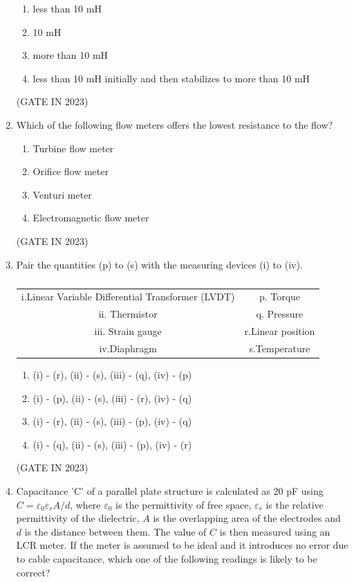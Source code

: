 \documentclass[journal]{IEEEtran}
\begin{document}
\begin{enumerate}
    \begin{enumerate}
        \item less than 10 mH
        \item 10 mH
        \item more than 10 mH
        \item less than 10 mH initially and then stabilizes to more than 10 mH
    \end{enumerate}
    \hfill(GATE IN 2023)

    \item Which of the following flow meters offers the lowest resistance to the flow?
    
    \begin{enumerate}
        \item Turbine flow meter
        \item Orifice flow meter
        \item Venturi meter
        \item Electromagnetic flow meter
    \end{enumerate}
    \hfill(GATE IN 2023)

    \item Pair the quantities (p) to (s) with the measuring devices (i) to (iv).
    
\begin{table}[H]
\begin{tabular}{c c}
i.Linear Variable Differential Transformer (LVDT)& p. Torque \\
ii. Thermistor & q. Pressure \\
iii. Strain gauge & r.Linear position  \\
iv.Diaphragm & s.Temperature \\
\end{tabular}
\caption{}
\label{tab:matching 1}
\end{table}
    \begin{enumerate}
        \item (i) - (r), (ii) - (s), (iii) - (q), (iv) - (p)
        \item (i) - (p), (ii) - (s), (iii) - (r), (iv) - (q)
        \item (i) - (r), (ii) - (s), (iii) - (p), (iv) - (q)
        \item (i) - (q), (ii) - (s), (iii) - (p), (iv) - (r)
    \end{enumerate}
    \hfill(GATE IN 2023)

    \item Capacitance 'C' of a parallel plate structure is calculated as 20 pF using $C = \varepsilon_0 \varepsilon_r A / d$, where $\varepsilon_0$ is the permittivity of free space, $\varepsilon_r$ is the relative permittivity of the dielectric, $A$ is the overlapping area of the electrodes and $d$ is the distance between them. The value of $C$ is then measured using an LCR meter. If the meter is assumed to be ideal and it introduces no error due to cable capacitance, which one of the following readings is likely to be correct?
    

\end{enumerate}
\end{document}
